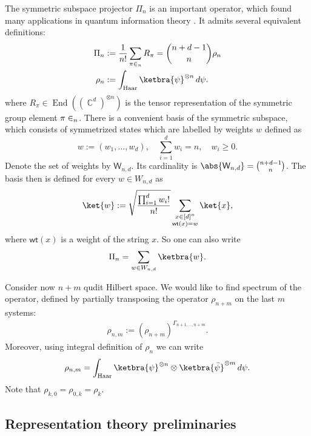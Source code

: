 \documentclass[aps,twocolumn,pra,superscriptaddress,nofootinbib]{revtex4-2}
\newcommand{\proj}[1]{|#1\rangle\langle#1|}
\newcommand{\xp}[1]{^{\otimes #1}}
\let\S\relax
\DeclareMathOperator{\S}{S} %
\DeclareMathOperator{\C}{\mathbb{C}} %
\DeclareMathOperator{\End}{End}
\begin{document}
The symmetric subspace projector $\Pi_{n}$ is an important operator, which found many applications in quantum information theory \cite{harrow2013churchsymmetricsubspace}. 
It admits several equivalent definitions:
\begin{align}
    \Pi_{n} &:= \frac{1}{n!} \sum_{\pi \in \S_n} R_\pi = \binom{n+d-1}{n} \rho_n \\
    \rho_n &:= \int_{\mathrm{Haar}} \ketbra{\psi}\xp{n} \, d\psi.
\end{align}
where $R_\pi \in \End((\C^d)\xp{n})$ is the tensor representation of the symmetric group element $\pi \in \S_n$. There is a convenient basis of the symmetric subspace, which consists of symmetrized states which are labelled by weights $w$ defined as
\begin{equation}
    w := (w_1,\dotsc,w_d), \quad \sum_{i=1}^d w_i = n, \quad w_i \geq 0.
\end{equation}
Denote the set of weights by $\mathsf{W}_{n,d}$. Its cardinality is $\abs{\mathsf{W}_{n,d}} = \binom{n+d-1}{n}$. The basis then is defined for every $w \in W_{n,d}$ as
\begin{equation}
   \ket{w} := \sqrt{\frac{\prod_{i=1}^d w_i!}{n!}} \sum_{\substack{x \in [d]^n \\ \mathsf{wt}(x)=w}} \ket{x}  ,
\end{equation}
where $\mathsf{wt}(x)$ is a weight of the string $x$. So one can also write
\begin{equation}
    \Pi_{n} = \sum_{w \in W_{n,d}} \ketbra{w}.
\end{equation}

Consider now $n+m$ qudit Hilbert space. We would like to find spectrum of the operator, defined by partially transposing the operator $\rho_{n+m}$ on the last $m$ systems:
\begin{align}
    \rho_{n,m} := (\rho_{n+m})^{\mathsf{\Gamma}_{n+1,\dotsc,n+m}}.
\end{align}
Moreover, using integral definition of $\rho_n$ we can write
\begin{align} \label{Eq:ProjectorHaarIdentity}
    \rho_{n,m} = \int_{\mathrm{Haar}} \ketbra{\psi}\xp{n} \otimes  \ketbra{\bar{\psi}}\xp{m} \, d\psi. 
\end{align}
Note that $\rho_{k,0} = \rho_{0,k} = \rho_{k}$.

\subsection{Representation theory preliminaries}
\end{document}

